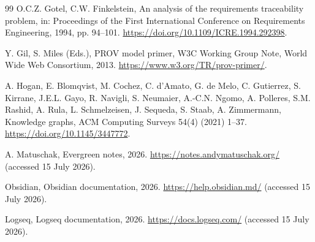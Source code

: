 \documentclass[preprint,12pt,a4paper]{elsarticle}
\begin{document}
\begin{thebibliography}{99}
O.C.Z. Gotel, C.W. Finkelstein, An analysis of the requirements traceability
problem, in: Proceedings of the First International Conference on Requirements
Engineering, 1994, pp. 94--101.
\url{https://doi.org/10.1109/ICRE.1994.292398}.

Y. Gil, S. Miles (Eds.), PROV model primer, W3C Working Group Note,
World Wide Web Consortium, 2013.
\url{https://www.w3.org/TR/prov-primer/}.

A. Hogan, E. Blomqvist, M. Cochez, C. d'Amato, G. de Melo, C. Gutierrez,
S. Kirrane, J.E.L. Gayo, R. Navigli, S. Neumaier, A.-C.N. Ngomo,
A. Polleres, S.M. Rashid, A. Rula, L. Schmelzeisen, J. Sequeda,
S. Staab, A. Zimmermann, Knowledge graphs,
ACM Computing Surveys 54(4) (2021) 1--37.
\url{https://doi.org/10.1145/3447772}.

A. Matuschak, Evergreen notes, 2026.
\url{https://notes.andymatuschak.org/} (accessed 15 July 2026).

Obsidian, Obsidian documentation, 2026.
\url{https://help.obsidian.md/} (accessed 15 July 2026).

Logseq, Logseq documentation, 2026.
\url{https://docs.logseq.com/} (accessed 15 July 2026).

\end{thebibliography}
\end{document}
